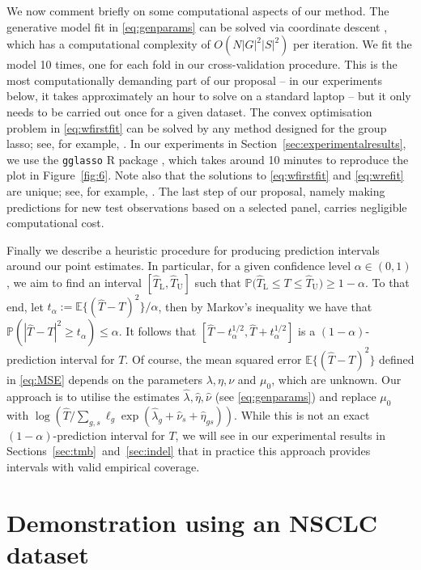 \documentclass[../thesis.tex]{subfiles}
\begin{document}
We now comment briefly on some computational aspects of our method. The generative model fit in \eqref{eq:genparams} can be solved via coordinate descent \citep[see, for example,][]{friedman_regularization_2010}, which has a computational complexity of $O(N|G|^2|S|^2)$ per iteration.  We fit the model 10 times, one for each fold in our cross-validation procedure. This is the most computationally demanding part of our proposal -- in our experiments below, it takes approximately an hour to solve on a standard laptop -- but it only needs to be carried out once for a given dataset.  The convex optimisation problem in \eqref{eq:wfirstfit} can be solved by any method designed for the group \gls{lasso}; see, for example, \citet{yang_fast_2015}. In our experiments in Section~\ref{sec:experimentalresults}, we use the \texttt{gglasso} R package \citep{yang_gglasso_2020}, which takes around 10 minutes to reproduce the plot in Figure~\ref{fig:6}. Note also that the solutions to \eqref{eq:wfirstfit} and \eqref{eq:wrefit} are unique; see, for example, \citet[Theorem~1]{roth_group-lasso_2008}.  The last step of our proposal, namely making predictions for new test observations based on a selected panel, carries negligible computational cost.  

Finally we describe a heuristic procedure for producing prediction intervals around our point estimates.  In particular, for a given confidence level $\alpha \in (0,1)$, we aim to find an interval $[\hat{T}_{\mathrm{L}}, \hat{T}_{\mathrm{U}}]$ such that $\mathbb{P}\bigl(\hat{T}_{\mathrm{L}} \leq T \leq \hat{T}_{\mathrm{U}}\bigr) \geq 1- \alpha.$  To that end, let $t_\alpha := \mathbb{E}\{(\hat{T} - T)^2\}/\alpha$, then by Markov's inequality we have that $\mathbb{P}(|\hat{T} - T|^2 \geq t_\alpha) \leq \alpha$. It follows that $[\hat{T} - t_\alpha^{1/2} , \hat{T}+ t_\alpha^{1/2}]$ is a $(1-\alpha)$-prediction interval for $T$. Of course, the mean squared error $\mathbb{E}\{(\hat{T}-T)^2\}$ defined in \eqref{eq:MSE} depends on the parameters $\lambda, \eta, \nu$ and $\mu_0$, which are unknown.  Our approach is to utilise the estimates $\hat{\lambda}, \hat{\eta}, \hat{\nu}$ (see \eqref{eq:genparams}) and replace $\mu_0$ with $\log(\hat{T}/\sum_{g,s}\ell_g\exp(\hat{\lambda}_g + \hat{\nu}_s + \hat{\eta}_{gs}))$. While this is not an exact $(1-\alpha)$-prediction interval for $T$,  we will see in our experimental results in Sections~\ref{sec:tmb}~and~\ref{sec:indel} that in practice this approach provides intervals with valid empirical coverage.  


\section{Demonstration using an NSCLC dataset \label{sec:experimentalresults}}
\end{document}
